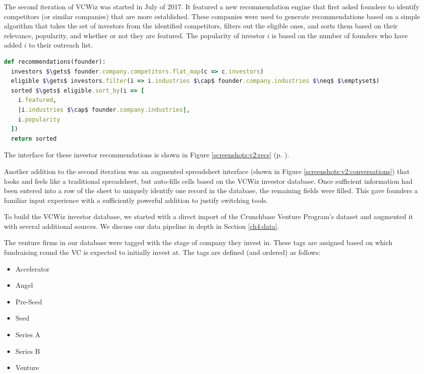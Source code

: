 The second iteration of VCWiz was started in July of 2017. It featured a new recommendation engine that first asked founders to identify competitors (or similar companies) that are more established. These companies were used to generate recommendations based on a simple algorithm that takes the set of investors from the identified competitors, filters out the eligible ones, and sorts them based on their relevance, popularity, and whether or not they are featured. The popularity of investor $i$ is based on the number of founders who have added $i$ to their outreach list.

\begin{lstlisting}[frame=single,mathescape=true,language=Ruby,basicstyle=\footnotesize,columns=fullflexible]
def recommendations(founder):
  investors $\gets$ founder.company.competitors.flat_map(c => c.investors)
  eligible $\gets$ investors.filter(i => i.industries $\cap$ founder.company.industries $\neq$ $\emptyset$)
  sorted $\gets$ eligible.sort_by(i => [
    i.featured,
    |i.industries $\cap$ founder.company.industries|,
    i.popularity
  ])
  return sorted
\end{lstlisting}

The interface for these investor recommendations is shown in Figure \ref{screenshots:v2:recs} (p. \pageref{screenshots:v2:recs}).

Another addition to the second iteration was an augmented spreadsheet interface (shown in Figure \ref{screenshots:v2:conversations}) that looks and feels like a traditional spreadsheet, but auto-fills cells based on the VCWiz investor database. Once sufficient information had been entered into a row of the sheet to uniquely identify one record in the database, the remaining fields were filled. This gave founders a familiar input experience with a sufficiently powerful addition to justify switching tools.

To build the VCWiz investor database, we started with a direct import of the Crunchbase Venture Program's dataset and augmented it with several additional sources. We discuss our data pipeline in depth in Section \ref{ch4:data}.

The venture firms in our database were tagged with the stage of company they invest in. These tags are assigned based on which fundraising round the VC is expected to initially invest at. The tags are defined (and ordered) as follows:

\begin{multicols}{2}
\begin{itemize}
  \item Accelerator
  \item Angel
  \item Pre-Seed
  \item Seed
  \item Series A
  \item Series B
  \item Venture
\end{itemize}
\end{multicols}

